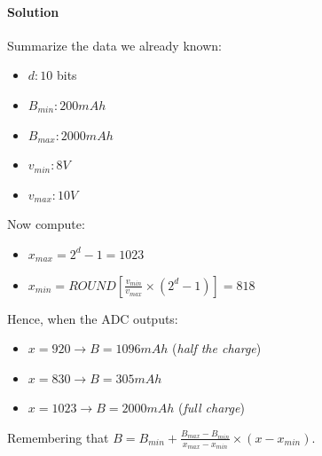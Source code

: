 \documentclass[10pt,a4paper]{report}
\theoremstyle{definition}
\begin{document}
\paragraph{Solution}\label{sec:solution}
Summarize the data we already known:
\begin{itemize}
	\item 
	$d: 10$ bits
	\item 
	$B_{min}: 200mAh$
	\item 
	$B_{max}: 2000mAh$
	\item 
	$v_{min}: 8V$
	\item 
	$v_{max}: 10V$
\end{itemize}
Now compute:
\begin{itemize}
	\item 
	$x_{max} = 2^{d}-1 = 1023$
	\item 
	$x_{min} = ROUND [\frac{v_{min}}{v_{max}}\times (2^{d}-1)]=818$
\end{itemize}
Hence, when the ADC outputs:
\begin{itemize}
	\item 
	$x =920 \rightarrow B = 1096 mAh$ (\textit{half the charge})
	\item 
	$x = 830  \rightarrow B = 305 mAh$
	\item 
	$x = 1023  \rightarrow B = 2000mAh$ (\textit{full charge})

\end{itemize}
Remembering that $B = B_{min}+\frac{B_{max}-B_{min}}{x_{max}-x_{min}} \times (x-x_{min})$.
\end{document}
